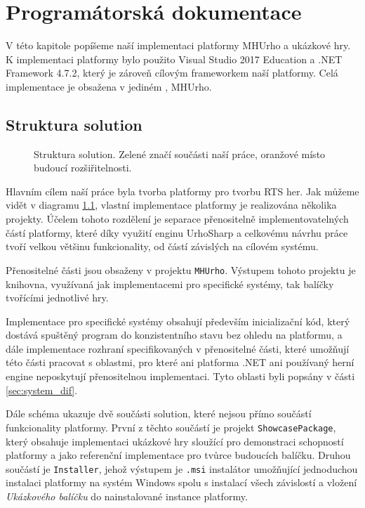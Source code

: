 \chapter{Programátorská dokumentace}
V této kapitole popíšeme naší implementaci platformy MHUrho a ukázkové hry. K implementaci platformy bylo použito Visual Studio 2017 Education a .NET Framework 4.7.2, který je zároveň cílovým frameworkem naší platformy. Celá implementace je obsažena v jediném , MHUrho. 

\section{Struktura solution}

\begin{figure}[h]
	\centering
	\fontsize{10pt}{11pt}\selectfont
	\def\svgwidth{0.9\textwidth}
	
	\caption{Struktura solution. Zelené značí součásti naší práce, oranžové místo budoucí rozšiřitelnosti.}
	\label{fig:solution_structure}
\end{figure}

Hlavním cílem naší práce byla tvorba platformy pro tvorbu RTS her. Jak můžeme vidět v diagramu \ref{fig:solution_structure}, vlastní implementace platformy je realizována několika projekty. Účelem tohoto rozdělení je separace přenositelně implementovatelných částí platformy, které díky využití enginu UrhoSharp a celkovému návrhu práce tvoří velkou většinu funkcionality, od částí závislých na cílovém systému. 

Přenositelné části jsou obsaženy v projektu \texttt{MHUrho}. Výstupem tohoto projektu je knihovna, využívaná jak implementacemi pro specifické systémy, tak balíčky tvořícími jednotlivé hry. 

Implementace pro specifické systémy obsahují především inicializační kód, který dostává spuštěný program do konzistentního stavu bez ohledu na platformu, a dále implementace rozhraní specifikovaných v přenositelné části, které umožňují této části pracovat s oblastmi, pro které ani platforma .NET ani používaný herní engine neposkytují přenositelnou implementaci. Tyto oblasti byli popsány v části \ref{sec:system_dif}.

Dále schéma ukazuje dvě součásti solution, které nejsou přímo součástí funkcionality platformy. První z těchto součástí je projekt \texttt{ShowcasePackage}, který obsahuje implementaci ukázkové hry sloužící pro demonstraci schopností platformy a jako referenční implementace pro tvůrce budoucích balíčku. Druhou součástí je \texttt{Installer}, jehož výstupem je \texttt{.msi} instalátor umožňující jednoduchou instalaci platformy na systém Windows spolu s instalací všech závislostí a vložení \textit{Ukázkového balíčku} do nainstalované instance platformy.

